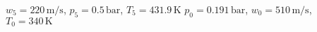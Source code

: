 \( w_5 = 220 \, \text{m/s} \), \( p_5 = 0.5 \, \text{bar} \), \( T_5 = 431.9 \, \text{K} \)  
\( p_0 = 0.191 \, \text{bar} \), \( w_0 = 510 \, \text{m/s} \), \( T_0 = 340 \, \text{K} \)